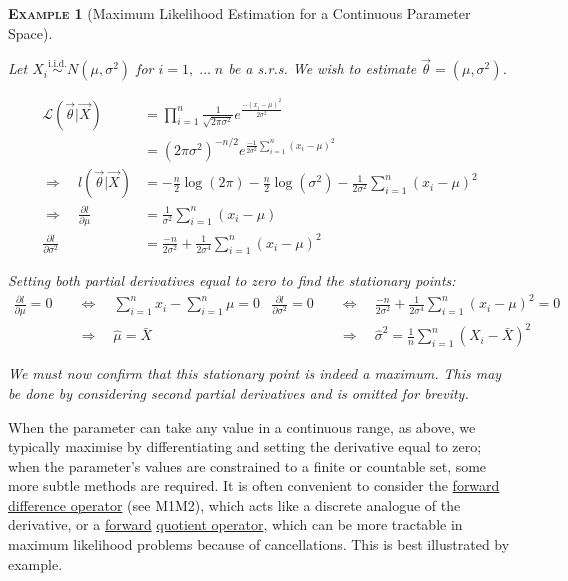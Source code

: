 \documentclass[12pt,a4paper]{article}
\newtheorem{example}{\textsc{Example}}[section]
\begin{document}
\begin{example}[Maximum Likelihood Estimation for a Continuous Parameter Space]$\;$\par\vspace{1cm}

Let $X_i \overset{\text{i.i.d.}}{\sim} N(\mu, \sigma^2)$ for $i = 1,\;\hdots\; n$ be a s.r.s. We wish to estimate $\vec{\theta} = (\mu,\sigma^2)$.

\begin{align*}
\mathcal{L}(\vec{\theta}|\vec{X}) &= \prod_{i=1}^n \frac{1}{\sqrt{2 \pi \sigma^2}} e^{\frac{-(x_i - \mu)^2}{2\sigma^2}}\\
&= (2\pi\sigma^2)^{-n/2} e^{\frac{-1}{2\sigma^2} \sum\limits_{i=1}^n (x_i - \mu)^2}\\
\Rightarrow \quad l(\vec{\theta}|\vec{X}) &= -\frac{n}{2}\log(2\pi) - \frac{n}{2}\log(\sigma^2) - \frac{1}{2\sigma^2} \sum_{i=1}^n (x_i - \mu)^2\\
\Rightarrow\quad \frac{\partial l}{\partial \mu} &= \frac{1}{\sigma^2}\sum_{i=1}^n(x_i - \mu)\\
\frac{\partial l}{\partial \sigma^2} &= \frac{-n}{2\sigma^2} + \frac{1}{2\sigma^4}\sum_{i=1}^n(x_i - \mu)^2
\end{align*}

\noindent Setting both partial derivatives equal to zero to find the stationary points:
\begin{align*}
\frac{\partial l}{\partial \mu} = 0 \quad&\Leftrightarrow\quad \sum_{i=1}^n x_i - \sum_{i=1}^n \mu = 0 & \frac{\partial l}{\partial \sigma^2} = 0 \quad&\Leftrightarrow\quad \frac{-n}{2\sigma^2} + \frac{1}{2\sigma^4}\sum_{i=1}^n (x_i - \mu)^2 = 0\\
&\Rightarrow\quad \hat{\mu} = \bar{X} & &\Rightarrow\quad \hat{\sigma}^2 = \frac{1}{n} \sum_{i=1}^n (X_i - \bar{X})^2
\end{align*}

We must now confirm that this stationary point is indeed a maximum. This may be done by considering second partial derivatives and is omitted for brevity.

\end{example}

When the parameter can take any value in a continuous range, as above, we typically maximise by differentiating and setting the derivative equal to zero; when the parameter's values are constrained to a finite or countable set, some more subtle methods are required. It is often convenient to consider the \underline{forward difference operator} (see M1M2), which acts like a discrete analogue of the derivative, or a \underline{forward} \underline{quotient operator}, which can be more tractable in maximum likelihood problems because of cancellations. This is best illustrated by example.
\end{document}

